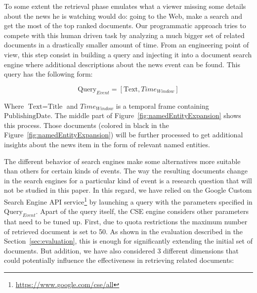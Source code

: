 \documentclass{llncs}
\begin{document}
To some extent the retrieval phase emulates what a viewer missing some details about the news he is watching would do: going to the Web, make a search and get the most of the top ranked documents. Our programmatic approach tries to compete with this human driven task by analyzing a much bigger set of related documents in a drastically smaller amount of time. From an engineering point of view, this step consist in building a query and injecting it into a document search engine where additional descriptions about the news event can be found. This query has the following form:

\begin{equation}
\text{Query}_{Event} =\left [ \text{Text}, Time_{Window} \right ]
\end{equation}

Where $\text{Text}=\text{Title}$ and $Time_{Window}$ is a temporal frame containing $\text{PublishingDate}$. The middle part of Figure~\ref{fig:namedEntityExpansion} shows this process. Those documents (colored in black in the Figure~\ref{fig:namedEntityExpansion}) will be further processed to get additional insights about the news item in the form of relevant named entities.

The different behavior of search engines make some alternatives more suitable than others for certain kinds of events. The way the resulting documents change in the search engines for a particular kind of event is a research question that will not be studied in this paper. In this regard, we have relied on the Google Custom Search Engine API service\footnote{\fontsize{8pt}{1em}\selectfont  \url{https://www.google.com/cse/all}} by launching a query with the parameters specified in $\text{Query}_{Event}$. Apart of the query itself, the CSE engine considers other parameters that need to be tuned up. First, due to quota restrictions the maximum number of retrieved document is set to 50. As shown in the evaluation described in the Section~\ref{sec:evaluation}, this is enough for significantly extending the initial set of documents. But addition, we have also considered 3 different dimensions that could potentially influence the effectiveness in retrieving related documents:
\end{document}
